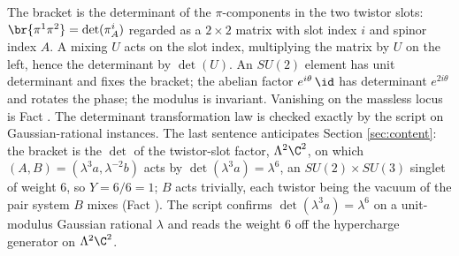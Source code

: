 The bracket is the determinant of the $\pi$-components in the two twistor slots: $\br{\pi^{1}\pi^{2}} = \det(\pi^{i}_{A})$ regarded as a $2 \times 2$ matrix with slot index $i$ and spinor index $A$. A mixing $U$ acts on the slot index, multiplying the matrix by $U$ on the left, hence the determinant by $\det(U)$. An $SU(2)$ element has unit determinant and fixes the bracket; the abelian factor $e^{i\theta}\,\id$ has determinant $e^{2i\theta}$ and rotates the phase; the modulus is invariant. Vanishing on the massless locus is Fact . The determinant transformation law is checked exactly by the script on Gaussian-rational instances. The last sentence anticipates Section \ref{sec:content}: the bracket is the $\det$ of the twistor-slot factor, $\Lambda^{2}\C^{2}$, on which $(A, B) = (\lambda^{3}a, \lambda^{-2}b)$ acts by $\det(\lambda^{3}a) = \lambda^{6}$, an $SU(2) \times SU(3)$ singlet of weight $6$, so $Y = 6/6 = 1$; $B$ acts trivially, each twistor being the vacuum of the pair system $B$ mixes (Fact ). The script confirms $\det(\lambda^{3}a) = \lambda^{6}$ on a unit-modulus Gaussian rational $\lambda$ and reads the weight $6$ off the hypercharge generator on $\Lambda^{2}\C^{2}$.
